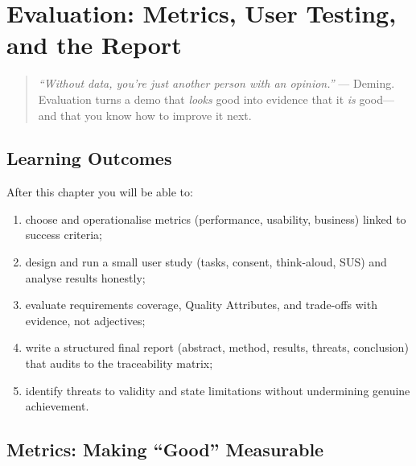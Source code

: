 \chapter{Evaluation: Metrics, User Testing, and the Report}
\label{ch:evaluation}

\begin{quote}
\emph{``Without data, you're just another person with an opinion.''} --- Deming. Evaluation turns a demo that \emph{looks} good into evidence that it \emph{is} good---and that you know how to improve it next.
\end{quote}

\noindent{}

\vspace{0.4em}

\section*{Learning Outcomes}
After this chapter you will be able to:
\begin{enumerate}[label=(L\arabic*)]
    \item choose and operationalise metrics (performance, usability, business) linked to success criteria;
    \item design and run a small user study (tasks, consent, think-aloud, SUS) and analyse results honestly;
    \item evaluate requirements coverage, Quality Attributes, and trade-offs with evidence, not adjectives;
    \item write a structured final report (abstract, method, results, threats, conclusion) that audits to the traceability matrix;
    \item identify threats to validity and state limitations without undermining genuine achievement.
\end{enumerate}

\section{Metrics: Making ``Good'' Measurable}
\label{sec:metrics}

